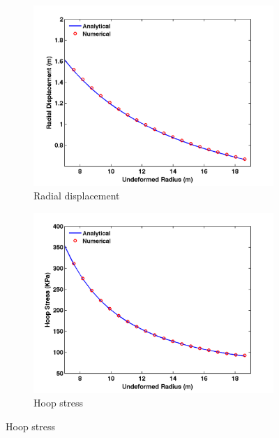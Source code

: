 \begin{figure}[H]
	\begin{subfigure}[b]{0.5\textwidth}
		\centering
		\includegraphics[width=\textwidth]{./figures/ur_200.png}
		\caption{Radial displacement}
		\label{ur_200}
	\end{subfigure}
	\begin{subfigure}[b]{0.5\textwidth}
		\centering
		\includegraphics[width=\textwidth]{./figures/hoop_stress_200.png}
		\caption{Hoop stress}
		\label{hoop_200}
	\end{subfigure}
	

\end{figure}
